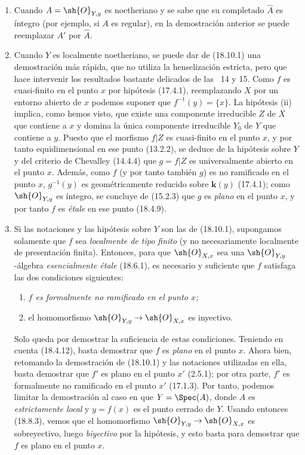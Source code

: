 \begin{remark}[18.10.2]
\label{IV.18.10.2}
\begin{enumerate}
  \item[(i)] Cuando $A=\sh{O}_{Y,y}$ es noetheriano y se sabe que su completado $\widehat A$ es íntegro (por ejemplo, si $A$ es regular), en la demostración anterior se puede reemplazar $A'$ por $\widehat A$.
  \item[(ii)] Cuando $Y$ es localmente noetheriano, se puede dar de (18.10.1) una demostración más rápida, que no utiliza la henselización estricta, pero que hace intervenir los resultados bastante delicados de las \textsection\textsection~14 y 15. Como $f$ es cuasi-finito en el punto $x$ por hipótesis (17.4.1), reemplazando $X$ por un entorno abierto de $x$ podemos suponer que $f^{-1}(y)=\{x\}$. La hipótesis (ii) implica, como hemos visto, que existe una componente irreducible $Z$ de $X$ que contiene a $x$ y domina la única componente irreducible $Y_0$ de $Y$ que contiene a $y$. Puesto que el morfismo $f|Z$ es cuasi-finito en el punto $x$, y por tanto equidimensional en ese punto (13.2.2), se deduce de la hipótesis sobre $Y$ y del criterio de Chevalley (14.4.4) que $g=f|Z$ es universalmente abierto en el punto $x$. Además, como $f$ (y por tanto también $g$) es no ramificado en el punto $x$, $g^{-1}(y)$ es geométricamente reducido sobre $\boldsymbol k(y)$ (17.4.1); como $\sh{O}_{Y,y}$ es íntegro, se concluye de (15.2.3) que $g$ es \emph{plano} en el punto $x$, y por tanto $f$ es \emph{étale} en ese punto (18.4.9).
  \item[(iii)] Si las notaciones y las hipótesis sobre $Y$ son las de (18.10.1), supongamos solamente que $f$ sea \emph{localmente de tipo finito} (y no necesariamente localmente de presentación finita). Entonces, para que $\sh{O}_{X,x}$ sea una $\sh{O}_{Y,y}$-álgebra \emph{esencialmente étale} (18.6.1), es necesario y suficiente que $f$ satisfaga las dos condiciones siguientes:


\begin{enumerate}
  \item[$1^\circ$] \itshape $f$ es formalmente no ramificado en el punto $x$;
  \item[$2^\circ$] el homomorfismo $\sh{O}_{Y,y}\to\sh{O}_{X,x}$ es inyectivo.
\end{enumerate}

Solo queda por demostrar la suficiencia de estas condiciones. Teniendo en cuenta (18.4.12), basta demostrar que $f$ es \emph{plano} en el punto $x$. Ahora bien, retomando la demostración de (18.10.1) y las notaciones utilizadas en ella, basta demostrar que $f'$ es plano en el punto $x'$ (2.5.1); por otra parte, $f'$ es formalmente no ramificado en el punto $x'$ (17.1.3). Por tanto, podemos limitar la demostración al caso en que $Y=\Spec(A)$, donde $A$ es \emph{estrictamente local} y $y=f(x)$ es el punto cerrado de $Y$. Usando entonces (18.8.3), vemos que el homomorfismo $\sh{O}_{Y,y}\to\sh{O}_{X,x}$ es sobreyectivo, luego \emph{biyectivo} por la hipótesis, y esto basta para demostrar que $f$ es plano en el punto $x$.


\end{enumerate}
\end{remark}
